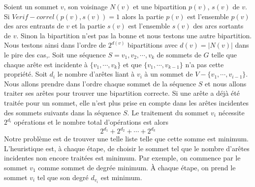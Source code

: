  Soient 
 un sommet $v$, 
 son voisinage $N(v)$ et 
 une bipartition $p(v)$, $s(v)$ de $v$.
 \newline
 Si $Verif-correl (p(v), s(v)) = 1$ alors la partie $p(v)$ est l'ensemble $p(v)$ des arcs entrants de $v$ et  la partie $s(v)$ est l'ensemble $s(v)$ des arcs sortants de $v$.    
Sinon la bipartition n'est pas la bonne et nous testons une autre bipartition.
Nous testons ainsi dans l'ordre de $2^{d(v)}$ bipartitions avec $d(v) = |N(v)|$ dans le pire des cas,.
\newline
Soit une s\'equence $S = v_1, v_2, \cdots, v_k$ de sommets de $G$ telle que 
chaque ar\^ete est incidente \`a $\{v_1, \cdots, v_k\}$ et que  $\{v_1, \cdots, v_{k-1}\}$ n'a pas cette propri\'et\'e.
\newline
Soit $d_i$ le nombre d'ar\^etes liant \`a $v_i$ \`a un sommet  de $V-\{v_1,\cdots, v_{i-1}\}$.
\newline
Nous allons prendre dans l'ordre chaque sommet de la s\'equence $S$ et nous allons traiter ses ar\^etes pour trouver une bipartition correcte.
Si une ar\^ete a d\'ej\`a \'et\'e trait\'ee pour un sommet, elle n'est plus prise en compte dans les ar\^etes incidentes des sommets suivants dans la s\'equence $S$.
Le traitement du sommet $v_i$ n\'ecessite $2^{d_i}$ op\'erations et le nombre total d'op\'erations est alors 
$$
 2^{d_1} + 2^{d_2} + \cdots + 2^{d_k}
$$  
Notre probl\`eme  est de trouver une telle liste telle que cette somme est minimum.
L'heuristique est, \`a chaque \'etape, de choisir le sommet tel que 
le nombre d'ar\^etes incidentes non encore trait\'ees est minimum.
Par exemple, on commence par le sommet $v_1$ comme sommet de degr\'ee minimum. 
\`A chaque \'etape, on prend le sommet $v_i$ tel que son degr\'e $d_{v_i}$ est minimum.
\newline 

